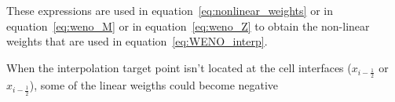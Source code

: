 These expressions are used in equation~\ref{eq:nonlinear_weights} or in equation~\ref{eq:weno_M} or in equation~\ref{eq:weno_Z} to obtain the non-linear weights that are used in equation~\ref{eq:WENO_interp}.

When the interpolation target point isn't located at the cell interfaces ($x_{i-\frac{1}{2}}$ or $x_{i-\frac{1}{2}}$), some of the linear weigths could become negative

